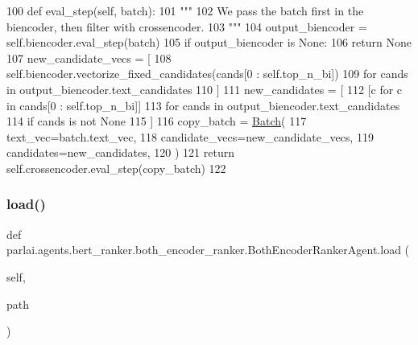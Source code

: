 \begin{DoxyCode}
100     \textcolor{keyword}{def }eval\_step(self, batch):
101         \textcolor{stringliteral}{"""}
102 \textcolor{stringliteral}{        We pass the batch first in the biencoder, then filter with crossencoder.}
103 \textcolor{stringliteral}{        """}
104         output\_biencoder = self.biencoder.eval\_step(batch)
105         \textcolor{keywordflow}{if} output\_biencoder \textcolor{keywordflow}{is} \textcolor{keywordtype}{None}:
106             \textcolor{keywordflow}{return} \textcolor{keywordtype}{None}
107         new\_candidate\_vecs = [
108             self.biencoder.vectorize\_fixed\_candidates(cands[0 : self.top\_n\_bi])
109             \textcolor{keywordflow}{for} cands \textcolor{keywordflow}{in} output\_biencoder.text\_candidates
110         ]
111         new\_candidates = [
112             [c \textcolor{keywordflow}{for} c \textcolor{keywordflow}{in} cands[0 : self.top\_n\_bi]]
113             \textcolor{keywordflow}{for} cands \textcolor{keywordflow}{in} output\_biencoder.text\_candidates
114             \textcolor{keywordflow}{if} cands \textcolor{keywordflow}{is} \textcolor{keywordflow}{not} \textcolor{keywordtype}{None}
115         ]
116         copy\_batch = \hyperlink{namespaceparlai_1_1agents_1_1legacy__agents_1_1seq2seq_1_1torch__agent__v1_a74cfde390a2b9861179ac0fcd59da28c}{Batch}(
117             text\_vec=batch.text\_vec,
118             candidate\_vecs=new\_candidate\_vecs,
119             candidates=new\_candidates,
120         )
121         \textcolor{keywordflow}{return} self.crossencoder.eval\_step(copy\_batch)
122 
\end{DoxyCode}
\mbox{\label{classparlai_1_1agents_1_1bert__ranker_1_1both__encoder__ranker_1_1BothEncoderRankerAgent_a3900966ef98a770cf6e871bb7de67907}} 
\subsubsection{\texorpdfstring{load()}{load()}}
{\footnotesize\ttfamily def parlai.\+agents.\+bert\+\_\+ranker.\+both\+\_\+encoder\+\_\+ranker.\+Both\+Encoder\+Ranker\+Agent.\+load (\begin{DoxyParamCaption}\item[{}]{self,  }\item[{}]{path }\end{DoxyParamCaption})}



